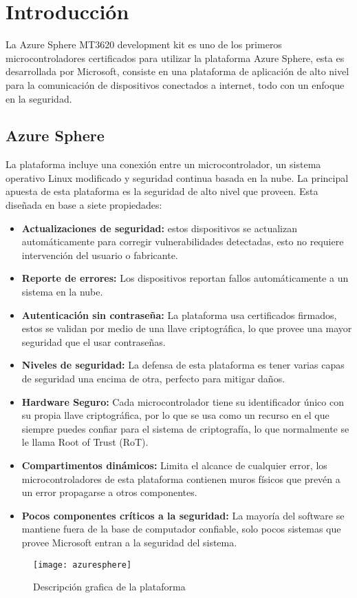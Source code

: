 \section{Introducción}

La Azure Sphere MT3620 development kit es uno de los primeros microcontroladores certificados para utilizar la plataforma Azure Sphere, esta es desarrollada por Microsoft, consiste en una plataforma de aplicación de alto nivel para la comunicación de dispositivos conectados a internet, todo con un enfoque en la seguridad.
\subsection{Azure Sphere}
La plataforma incluye una conexión entre un microcontrolador, un sistema operativo Linux modificado y seguridad continua basada en la nube.
La principal apuesta de esta plataforma es la seguridad de alto nivel que proveen. Esta diseñada en base a siete propiedades:
\begin{itemize}
	\item 
	\textbf{Actualizaciones de seguridad:} estos dispositivos se actualizan automáticamente para corregir vulnerabilidades detectadas, esto no requiere intervención del usuario o fabricante.
	\item 
	\textbf{Reporte de errores:} Los dispositivos reportan fallos automáticamente a un sistema en la nube.
	\item
	\textbf{Autenticación sin contraseña:} La plataforma usa certificados firmados, estos se validan por medio de una llave criptográfica, lo que provee una mayor seguridad que el usar contraseñas.
	\item
	\textbf{Niveles de seguridad:} La defensa de esta plataforma es tener varias capas de seguridad una encima de otra, perfecto para mitigar daños.
	\item
	\textbf{Hardware Seguro:} Cada microcontrolador tiene su identificador único con su propia llave criptográfica, por lo que se usa como un recurso en el que siempre puedes confiar para el sistema de criptografía, lo que normalmente se le llama Root of Trust (RoT).
	\item
	\textbf{Compartimentos dinámicos:} Limita el alcance de cualquier error, los microcontroladores de esta plataforma contienen muros físicos que prevén a un error propagarse a otros componentes.
	\item
	\textbf{Pocos componentes críticos a la seguridad:} La mayoría del software se mantiene fuera de la base de computador confiable, solo pocos sistemas que provee Microsoft entran a la seguridad del sistema.
\end{itemize}
\begin{figure}[h]
	\centering
	\texttt{[image: azuresphere]}
	\caption{Descripción grafica de la plataforma}
\end{figure}